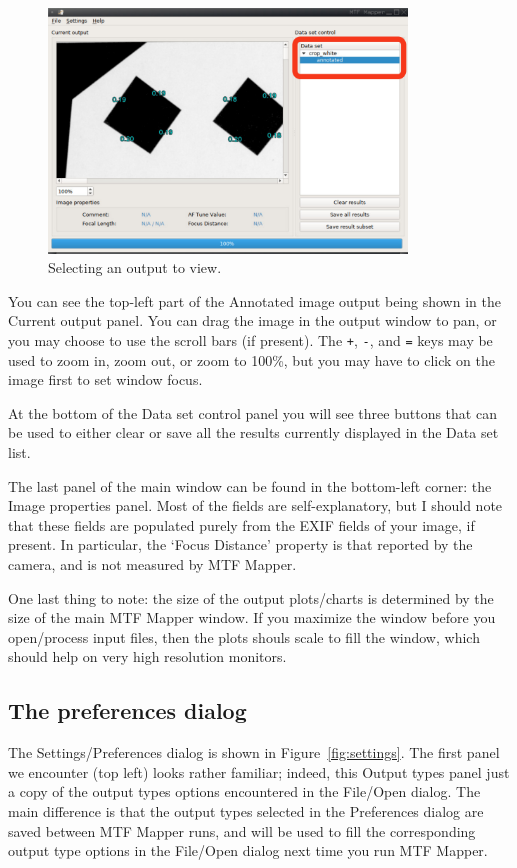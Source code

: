 \documentclass[a4paper]{article}
\begin{document}
\begin{figure}[bt!]
\centering
\includegraphics[width=0.85\textwidth]{figures/open_example2}
\caption{Selecting an output to view.}
\label{fig:open_example2}
\end{figure}

You can see the top-left part of the \textsf{Annotated} image output being shown in
the \textsf{Current output} panel. You can drag the image in the output window to pan, 
or you may choose to use the scroll bars (if present). 
The \verb-+-, \verb+-+, and \verb+=+ keys may be used to zoom in, zoom out,
or zoom to 100\%, but you may have to click on the image first to set window focus.

At the bottom of the \textsf{Data set control} panel you will see three
buttons that can be used to either clear or save all the results currently
displayed in the \textsf{Data set} list.

The last panel of the main window can be found in the bottom-left corner:
the \textsf{Image properties} panel. Most of the fields are
self-explanatory, but I should note that these fields are populated purely
from the EXIF fields of your image, if present. In particular, the `Focus
Distance' property is that reported by the camera, and is not measured by
MTF Mapper.

One last thing to note: the size of the output plots/charts is determined by
the size of the main MTF Mapper window. If you maximize the window before
you open/process input files, then the plots shouls scale to fill the
window, which should help on very high resolution monitors.

\subsection{The preferences dialog}
\label{sec:settings}
The \textsf{Settings/Preferences} dialog is shown in
Figure~\ref{fig:settings}. The first panel we encounter (top left) looks
rather familiar; indeed, this \textsf{Output types} panel just a copy of the output
types options encountered in the \textsf{File/Open} dialog. The main
difference is that the output types selected in the \textsf{Preferences}
dialog are saved between MTF Mapper runs, and will be used to fill the corresponding
output type options in the \textsf{File/Open} dialog next time you run MTF
Mapper.
\end{document}
